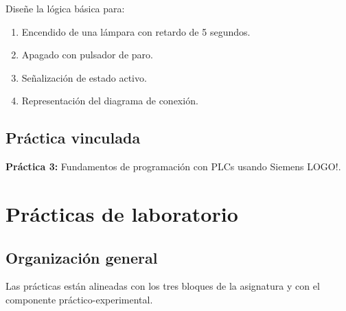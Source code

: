 \documentclass[
  spanish,
  letterpaper,
  DIV=11,
  numbers=noendperiod]{scrreprt}
\providecommand{\tightlist}{%
  \setlength{\itemsep}{0pt}\setlength{\parskip}{0pt}}
\begin{document}
Diseñe la lógica básica para:

\begin{enumerate}
\def\labelenumi{\arabic{enumi}.}
\tightlist
\item
  Encendido de una lámpara con retardo de 5 segundos.
\item
  Apagado con pulsador de paro.
\item
  Señalización de estado activo.
\item
  Representación del diagrama de conexión.
\end{enumerate}

\section{Práctica vinculada}\label{pruxe1ctica-vinculada-1}

\textbf{Práctica 3:} Fundamentos de programación con PLCs usando Siemens
LOGO!.


\chapter{Prácticas de laboratorio}\label{pruxe1cticas-de-laboratorio}

\section{Organización general}\label{organizaciuxf3n-general}

Las prácticas están alineadas con los tres bloques de la asignatura y
con el componente práctico-experimental.
\end{document}
